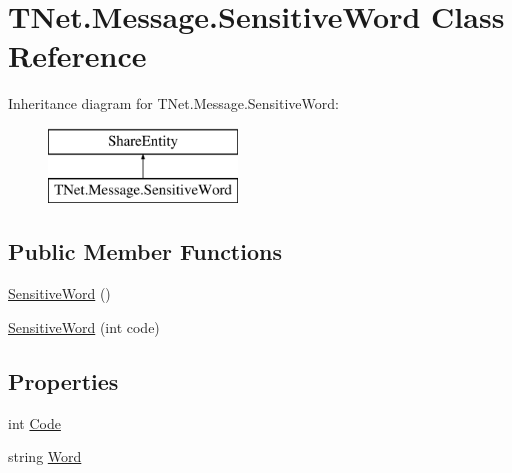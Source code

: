 \hypertarget{class_t_net_1_1_message_1_1_sensitive_word}{}\section{T\+Net.\+Message.\+Sensitive\+Word Class Reference}
\label{class_t_net_1_1_message_1_1_sensitive_word}


 


Inheritance diagram for T\+Net.\+Message.\+Sensitive\+Word\+:\begin{figure}[H]
\begin{center}
\leavevmode
\includegraphics[height=2.000000cm]{class_t_net_1_1_message_1_1_sensitive_word}
\end{center}
\end{figure}
\subsection*{Public Member Functions}
\begin{DoxyCompactItemize}
\item 
\mbox{\hyperlink{class_t_net_1_1_message_1_1_sensitive_word_a47b066d7b455f928e1e950c6c49d8b92}{Sensitive\+Word}} ()
\item 
\mbox{\hyperlink{class_t_net_1_1_message_1_1_sensitive_word_a31eb1270da012bba48a1771b58d64f18}{Sensitive\+Word}} (int code)
\end{DoxyCompactItemize}
\subsection*{Properties}
\begin{DoxyCompactItemize}
\item 
int \mbox{\hyperlink{class_t_net_1_1_message_1_1_sensitive_word_a23ae2c40b0227305c91bfe3d7e832191}{Code}}
\item 
string \mbox{\hyperlink{class_t_net_1_1_message_1_1_sensitive_word_afd980bae5a4a66932a7d05dad8587cbe}{Word}}
\end{DoxyCompactItemize}


